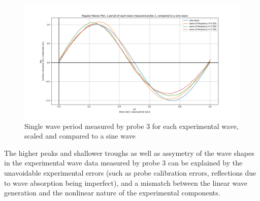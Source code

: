 \documentclass{article}
\begin{document}
	\begin{figure}[H]
		\centering
		\includegraphics[clip, trim = {2cm 1cm 2cm 1cm},width=\textwidth]{../graphs/Probe3.png}
		\caption{Single wave period measured by probe 3 for each experimental wave, scaled and compared to a sine wave}
		\label{probe3}
	\end{figure}
	The higher peaks and shallower troughs as well as assymetry of the wave shapes in the experimental wave data measured by probe 3 can be explained by the unavoidable experimental errors (such as probe calibration errors, reflections due to wave absorption being imperfect), and a mismatch between the linear wave generation and the nonlinear nature of the experimental components.
\end{document}
